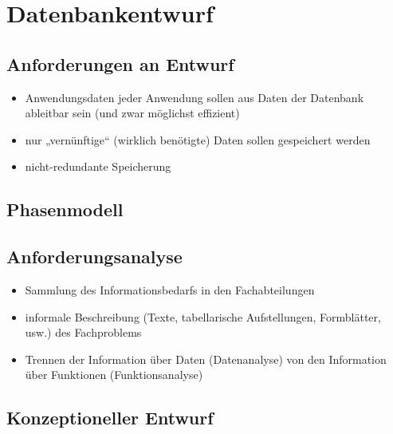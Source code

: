 \documentclass{scrartcl}
\begin{document}
\begin{tikzpicture}
\end{tikzpicture}

\section{Datenbankentwurf}

\subsection{Anforderungen an Entwurf}

\begin{itemize}
	\itemsep0em
	\item Anwendungsdaten jeder Anwendung sollen aus Daten der Datenbank ableitbar sein (und zwar möglichst effizient)
	\item nur „vernünftige“ (wirklich benötigte) Daten sollen gespeichert werden
	\item nicht-redundante Speicherung
\end{itemize}

\subsection{Phasenmodell}


\subsection{Anforderungsanalyse}

\begin{itemize}
	\itemsep0em
	\item Sammlung des Informationsbedarfs in den Fachabteilungen
	\item informale Beschreibung (Texte, tabellarische Aufstellungen, Formblätter, usw.) des Fachproblems
	\item Trennen der Information über Daten (Datenanalyse) von den Information über Funktionen (Funktionsanalyse)
\end{itemize}

\subsection{Konzeptioneller Entwurf}
\end{document}

